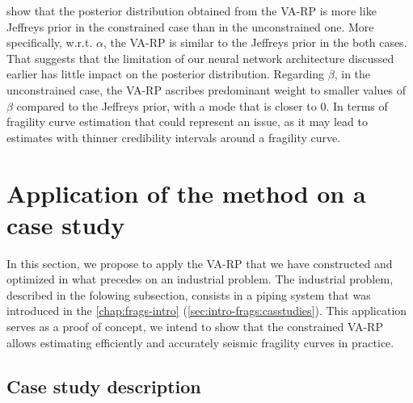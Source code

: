  show that the posterior distribution obtained from the VA-RP is more like Jeffreys prior %
in the constrained case than in the unconstrained one. 
More specifically, w.r.t. $\alpha$, the VA-RP is similar to the Jeffreys prior in the both cases. That suggests that the limitation of our neural network architecture discussed earlier has little impact on the posterior distribution.
Regarding $\beta$,
in the unconstrained case, the VA-RP ascribes predominant weight to smaller values of $\beta$ compared to the Jeffreys prior, with a mode that is closer to $0$. In terms of fragility curve estimation that could represent an issue, as it may lead to estimates with thinner credibility intervals around a fragility curve. %









\section{Application of the method on a case study}\label{sec:constr-frags:appasg}


In this section, we propose to apply the VA-RP that we have constructed and optimized
in what precedes on an industrial problem.
The industrial problem, described in the folowing subsection, consists in a piping system that was introduced in the \cref{chap:frags-intro} (\cref{sec:intro-frags:casstudies}). 
This application serves as a proof of concept, we intend to show that the constrained VA-RP allows estimating efficiently and accurately seismic fragility curves in practice.








\subsection{Case study description}\label{sec:constr-frags:subsec:asgdesc}


